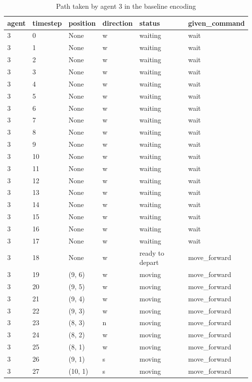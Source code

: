 \documentclass[12pt, a4paper]{llncs}
\begin{document}
\begin{table}[htbp]
  \centering
  \caption{Path taken by agent 3 in the baseline encoding}
  \label{tab:baseline3}
  \begin{tabular}{llllll}
    \toprule
    agent & timestep & position & direction & status & given\_command \\
    \midrule
3 & 0 & None & w & waiting & wait \\
3 & 1 & None & w & waiting & wait \\
3 & 2 & None & w & waiting & wait \\
3 & 3 & None & w & waiting & wait \\
3 & 4 & None & w & waiting & wait \\
3 & 5 & None & w & waiting & wait \\
3 & 6 & None & w & waiting & wait \\
3 & 7 & None & w & waiting & wait \\
3 & 8 & None & w & waiting & wait \\
3 & 9 & None & w & waiting & wait \\
3 & 10 & None & w & waiting & wait \\
3 & 11 & None & w & waiting & wait \\
3 & 12 & None & w & waiting & wait \\
3 & 13 & None & w & waiting & wait \\
3 & 14 & None & w & waiting & wait \\
3 & 15 & None & w & waiting & wait \\
3 & 16 & None & w & waiting & wait \\
3 & 17 & None & w & waiting & wait \\
3 & 18 & None & w & ready to depart & move\_forward \\
3 & 19 & (9, 6) & w & moving & move\_forward \\
3 & 20 & (9, 5) & w & moving & move\_forward \\
3 & 21 & (9, 4) & w & moving & move\_forward \\
3 & 22 & (9, 3) & w & moving & move\_forward \\
3 & 23 & (8, 3) & n & moving & move\_forward \\
3 & 24 & (8, 2) & w & moving & move\_forward \\
3 & 25 & (8, 1) & w & moving & move\_forward \\
3 & 26 & (9, 1) & s & moving & move\_forward \\
3 & 27 & (10, 1) & s & moving & move\_forward \\

\end{tabular}
\end{table}
\end{document}
